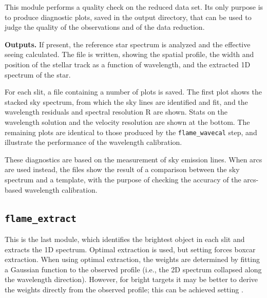 \documentclass[a4paper]{article}
\begin{document}
\begin{sloppypar}
This module performs a quality check on the reduced data set. Its only purpose is to produce diagnostic plots, saved in the output directory, that can be used to judge the quality of the observations and of the data reduction.

\medskip
\noindent
\textbf{Outputs.} If present, the reference star spectrum is analyzed and the effective seeing calculated. The file  is written, showing the spatial profile, the width and position of the stellar track as a function of wavelength, and the extracted 1D spectrum of the star.

For each slit, a  file containing a number of plots is saved. The first plot shows the stacked sky spectrum, from which the sky lines are identified and fit, and the wavelength residuals and spectral resolution R are shown. Stats on the wavelength solution and the velocity resolution are shown at the bottom. The remaining plots are identical to those produced by the \texttt{flame\_wavecal} step, and illustrate the performance of the wavelength calibration.

These diagnostics are based on the measurement of sky emission lines. When arcs are used instead, the files show the result of a comparison between the sky spectrum and a template, with the purpose of checking the accuracy of the arcs-based wavelength calibration.



\subsection{\texttt{flame\_extract}}
\label{sec:extract}

This is the last module, which identifies the brightest object in each slit and extracts the 1D spectrum. Optimal extraction is used, but setting  forces boxcar extraction. When using optimal extraction, the weights are determined by fitting a Gaussian function to the observed profile (i.e., the 2D spectrum collapsed along the wavelength direction). However, for bright targets it may be better to derive the weights directly from the observed profile; this can be achieved setting .


\end{sloppypar}
\end{document}
